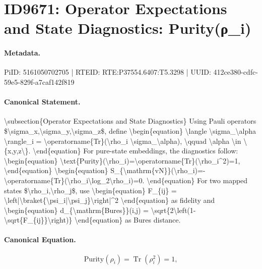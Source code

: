 \section*{ID9671: Operator Expectations and State Diagnostics: Purity(ρ\_i)}
\paragraph{Metadata.}
PiID: 5161050702705 | RTEID: RTE:P37554.6407:T5.3298 | UUID: 412ce380-cdfc-59e5-829f-a7caf142f819

\paragraph{Canonical Statement.}
\textbackslash{}subsection\{Operator Expectations and State Diagnostics\} Using Pauli operators \$\textbackslash{}sigma\_x,\textbackslash{}sigma\_y,\textbackslash{}sigma\_z\$, define \textbackslash{}begin\{equation\} \textbackslash{}langle \textbackslash{}sigma\_\textbackslash{}alpha \textbackslash{}rangle\_i = \textbackslash{}operatorname\{Tr\}(\textbackslash{}rho\_i \textbackslash{}sigma\_\textbackslash{}alpha), \textbackslash{}qquad \textbackslash{}alpha \textbackslash{}in \textbackslash{}\{x,y,z\textbackslash{}\}. \textbackslash{}end\{equation\} For pure-state embeddings, the diagnostics follow: \textbackslash{}begin\{equation\} \textbackslash{}text\{Purity\}(\textbackslash{}rho\_i)=\textbackslash{}operatorname\{Tr\}(\textbackslash{}rho\_i\textasciicircum{}2)=1, \textbackslash{}end\{equation\} \textbackslash{}begin\{equation\} S\_\{\textbackslash{}mathrm\{vN\}\}(\textbackslash{}rho\_i)=-\textbackslash{}operatorname\{Tr\}(\textbackslash{}rho\_i\textbackslash{}log\_2\textbackslash{}rho\_i)=0. \textbackslash{}end\{equation\} For two mapped states \$\textbackslash{}rho\_i,\textbackslash{}rho\_j\$, use \textbackslash{}begin\{equation\} F\_\{ij\} = \textbackslash{}left|\textbackslash{}braket\{\textbackslash{}psi\_i|\textbackslash{}psi\_j\}\textbackslash{}right|\textasciicircum{}2 \textbackslash{}end\{equation\} as fidelity and \textbackslash{}begin\{equation\} d\_\{\textbackslash{}mathrm\{Bures\}\}(i,j) = \textbackslash{}sqrt\{2\textbackslash{}left(1-\textbackslash{}sqrt\{F\_\{ij\}\}\textbackslash{}right)\} \textbackslash{}end\{equation\} as Bures distance.

\paragraph{Canonical Equation.}
\[
\text{Purity}(\rho_i)=\operatorname{Tr}(\rho_i^2)=1,
\]

